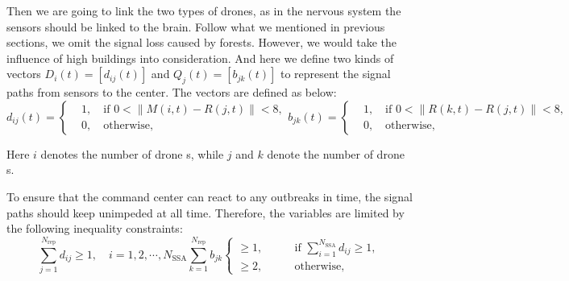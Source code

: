 \documentclass[13pt]{ctexart} %
\begin{document}
Then we are going to link the two types of drones, as in the nervous system the sensors should be linked to the brain. Follow what we mentioned in previous sections, we omit the signal loss caused by forests. However, we would take the influence of high buildings into consideration. And here we define two kinds of vectors $D_i(t)=[d_{ij}(t)]$ and $Q_j(t)=[b_{jk}(t)]$ to represent the signal paths from sensors to the center. The vectors are defined as below:
\begin{subequations}
    \begin{equation}
        d_{ij}(t)=\left\{
        \begin{aligned}
             & 1, \quad \text{if } 0< \lVert M(i,t)-R(j,t)\rVert< 8, \\
             & 0,\quad \text{otherwise},
        \end{aligned}
        \right.
    \end{equation}
    \begin{equation}
        b_{jk}(t)=\left\{
        \begin{aligned}
             & 1, \quad \text{if } 0< \lVert R(k,t)-R(j,t)\rVert< 8, \\
             & 0,\quad \text{otherwise},
        \end{aligned}
        \right.
    \end{equation}
\end{subequations}

Here $i$ denotes the number of drone \uppercase\expandafter{}s, while $j$ and $k$ denote the number of drone \uppercase\expandafter{}s.

To ensure that the command center can react to any outbreaks in time, the signal paths should keep unimpeded at all time. Therefore, the variables are limited by the following inequality constraints:
\begin{subequations}
    \begin{equation}
        \sum_{j=1}^{N_{\text{rep}}}d_{ij}\geq 1, \quad i=1,2,\cdots,N_{\text{SSA}}
    \end{equation}
    \begin{equation}
        \sum_{k=1}^{N_{\text{rep}}}b_{jk}\left\{
        \begin{aligned}
            \geq 1, & \qquad \text{if }\sum_{i=1}^{N_{\text{SSA}}} d_{ij}\geq 1, \\
            \geq 2, & \qquad \text{otherwise},
        \end{aligned}
        \right.
    \end{equation}
\end{subequations}
\end{document}
